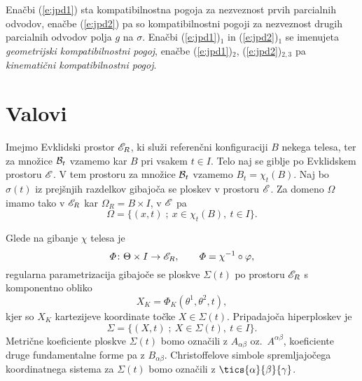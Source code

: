Enačbi (\ref{e:jpd1}) sta kompatibilnostna pogoja za nezveznost prvih parcialnih odvodov,
enačbe (\ref{e:jpd2}) pa so kompatibilnostni pogoji za nezveznost drugih parcialnih odvodov
polja $g$ na $\sigma$. Enačbi (\ref{e:jpd1})$_1$ in (\ref{e:jpd2})$_1$ se imenujeta
\emph{geometrijski kompatibilnostni pogoj}, enačbe (\ref{e:jpd1})$_2$, (\ref{e:jpd2})$_{2,3}$
pa \emph{kinematični kompatibilnostni pogoj}.


\section{Valovi}


Imejmo Evklidski prostor $\mathscr E_R$, ki služi referenčni konfiguraciji $B$ nekega telesa,
ter za množice $\mathcal B_t$ vzamemo kar $B$ pri vsakem $t\in I$. Telo naj se giblje po Evklidskem
prostoru $\mathscr E$. V tem prostoru za množice $\mathcal B_t$ vzamemo $B_t=\chi_t(B)$. Naj bo $\sigma(t)$
iz prejšnjih razdelkov gibajoča se ploskev v prostoru $\mathscr E$. Za domeno $\Omega$ imamo tako
v $\mathscr E_R$ kar $\Omega_R=B\times I$, v $\mathscr E$ pa
\[ \Omega=\{(x,t)\;;\ x\in\chi_t(B),\ t\in I\}. \]

Glede na gibanje $\chi$ telesa je
\[
	\varPhi\colon\Theta\times I\to\mathscr E_R,\qquad\varPhi=\chi^{-1}\circ\varphi,
\]
regularna parametrizacija gibajoče se ploskve $\Sigma(t)$ po prostoru $\mathscr E_R$
s komponentno obliko
\[ X_K=\varPhi_K(\theta^1,\theta^2,t), \]
kjer so $X_K$ kartezijeve koordinate točke $X\in\Sigma(t)$. Pripadajoča
hiperploskev je
\[ \Sigma = \{ (X,t)\;;\ X\in\Sigma(t),\ t\in I \}. \]
Metrične koeficiente ploskve $\Sigma(t)$ bomo označili
z $A_{\alpha\beta}$ oz.~$A^{\alpha\beta}$, koeficiente druge fundamentalne forme
pa z $B_{\alpha\beta}$. Christoffelove simbole spremljajočega koordinatnega
sistema za $\Sigma(t)$ bomo označili z $\tics{\alpha}{\beta}{\gamma}$.

